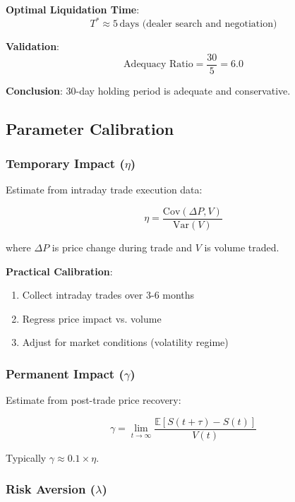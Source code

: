 \documentclass[11pt,a4paper]{article}
\newcommand{\E}{\mathbb{E}}
\newcommand{\Var}{\text{Var}}
\begin{document}
\textbf{Optimal Liquidation Time}:
\begin{equation}
T^* \approx 5\,\text{days (dealer search and negotiation)}
\end{equation}

\textbf{Validation}:
\begin{equation}
\text{Adequacy Ratio} = \frac{30}{5} = 6.0
\end{equation}

\textbf{Conclusion}: 30-day holding period is adequate and conservative.

\subsection{Parameter Calibration}

\subsubsection{Temporary Impact ($\eta$)}

Estimate from intraday trade execution data:

\begin{equation}
\eta = \frac{\text{Cov}(\Delta P, V)}{\Var(V)}
\end{equation}

where $\Delta P$ is price change during trade and $V$ is volume traded.

\textbf{Practical Calibration}:
\begin{enumerate}
    \item Collect intraday trades over 3-6 months
    \item Regress price impact vs. volume
    \item Adjust for market conditions (volatility regime)
\end{enumerate}

\subsubsection{Permanent Impact ($\gamma$)}

Estimate from post-trade price recovery:

\begin{equation}
\gamma = \lim_{t \to \infty} \frac{\E[S(t+\tau) - S(t)]}{V(t)}
\end{equation}

Typically $\gamma \approx 0.1 \times \eta$.

\subsubsection{Risk Aversion ($\lambda$)}
\end{document}
